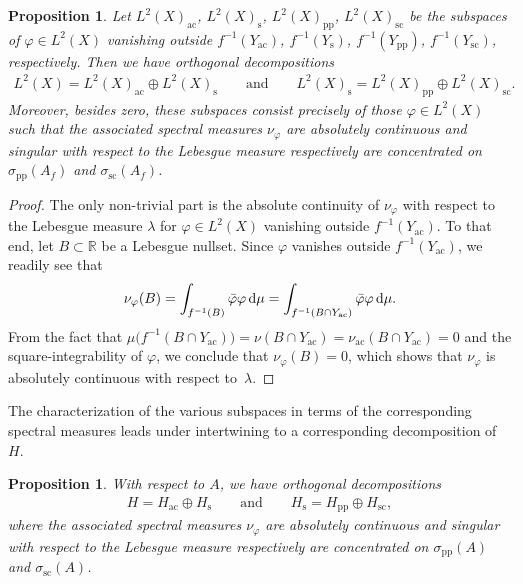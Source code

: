 \documentclass[pdftex]{sigma}
\numberwithin{equation}{section}
\newtheorem{Proposition}[Theorem]{Proposition}
\def\p{\mathrm{pp}}
\def\ac{\mathrm{ac}}
\def\sc{\mathrm{sc}}
\def\s{\mathrm s}
\def\R{\mathbb R}
\def\vf{\varphi}
\begin{document}
\begin{Proposition}%
Let $L^2(X)_{\ac}$, $L^2(X)_{\s}$, $L^2(X)_{\p}$, $L^2(X)_{\sc}$ be the subspaces of $\vf\in L^2(X)$
vanishing outside $f^{-1}(Y_{\ac})$, $f^{-1}(Y_{\s})$, $f^{-1}(Y_{\p})$, $f^{-1}(Y_{\sc})$, respectively.
Then we have orthogonal decompositions
\begin{align*}
	L^2(X) = L^2(X)_{\ac}\oplus L^2(X)_{\s}
	\qquad\text{and}\qquad
	L^2(X)_{\s} = L^2(X)_{\p}\oplus L^2(X)_{\sc}.
\end{align*}
Moreover, besides zero, these subspaces consist precisely of those $\vf\in L^2(X)$
such that the associated spectral measures $\nu_\vf$ are absolutely continuous and singular with respect to the Lebesgue measure
respectively are concentrated on $\sigma_{\p}(A_f)$ and $\sigma_{\sc}(A_f)$.
\end{Proposition}

\begin{proof}
The only non-trivial part is the absolute continuity of $\nu_\vf$ with respect to the Lebesgue measure $\lambda$
for $\vf\in L^2(X)$ vanishing outside $f^{-1}(Y_{\ac})$.
To that end, let $B \subset \R$ be a Lebesgue nullset.
Since $\vf$ vanishes outside $f^{-1}(Y_{\ac})$, we readily see that
\[
\nu_{\vf}(B) = \int_{f^{-1}(B)} \bar{\vf} \vf\, {\rm d} \mu = \int_{f^{-1}(B \cap Y_{\ac})} \bar{\vf} \vf \,{\rm d} \mu.
\]
From the fact that $\mu\bigl(f^{-1}(B \cap Y_{\ac})\bigr) = \nu(B \cap Y_{\ac}) = \nu_{\ac}(B \cap Y_{\ac}) = 0$
and the square-integrability of $\vf$, we conclude that $\nu_{\vf}(B) = 0$,
which shows that $\nu_{\vf}$ is absolutely continuous with respect to~$\lambda$.
\end{proof}

The characterization of the various subspaces in terms of the corresponding spectral measures
leads under intertwining to a corresponding decomposition of $H$.

\begin{Proposition}%
With respect to $A$, we have orthogonal decompositions
\begin{align*}
	H = H_{\ac} \oplus H_{\s} \qquad\text{and}\qquad H_{\s} = H_{\p} \oplus H_{\sc},
\end{align*}
where the associated spectral measures $\nu_\vf$ are absolutely continuous and singular with respect to the Lebesgue measure
respectively are concentrated on $\sigma_{\p}(A)$ and $\sigma_{\sc}(A)$.
\end{Proposition}
\end{document}
